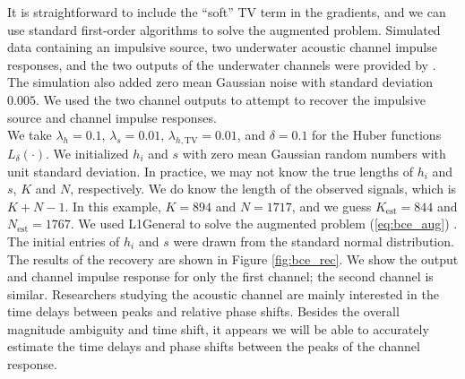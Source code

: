 \documentclass[journal]{IEEEtran}
\begin{document}
It is straightforward to include the ``soft'' TV term in the gradients, and we can use standard first-order algorithms to solve the augmented problem.  Simulated data containing an impulsive source, two underwater acoustic channel impulse responses, and the two outputs of the underwater channels were provided by \cite{rideout_2016}.  The simulation also added zero mean Gaussian noise with standard deviation $0.005$.  We used the two channel outputs to attempt to recover the impulsive source and channel impulse responses.\\

We take $\lambda_h = 0.1$, $\lambda_s=0.01$, $\lambda_{h,\text{TV}}=0.01$, and $\delta=0.1$ for the Huber functions $L_\delta(\cdot)$.  We initialized $h_i$ and $s$ with zero mean Gaussian random numbers with unit standard deviation.  In practice, we may not know the true lengths of $h_i$ and $s$, $K$ and $N$, respectively.  We do know the length of the observed signals, which is $K+N-1$.  In this example, $K=894$ and $N=1717$, and we guess $K_\text{est}=844$ and $N_\text{est}=1767$.  We used L1General to solve the augmented problem (\ref{eq:bce_aug}) \cite{schmidt_2010}.  The initial entries of $h_i$ and $s$ were drawn from the standard normal distribution.\\

The results of the recovery are shown in Figure \ref{fig:bce_rec}.  We show the output and channel impulse response for only the first channel; the second channel is similar.  Researchers studying the acoustic channel are mainly interested in the time delays between peaks and relative phase shifts\cite{rideout_2016}.  Besides the overall magnitude ambiguity and time shift, it appears we will be able to accurately estimate the time delays and phase shifts between the peaks of the channel response.
\end{document}
